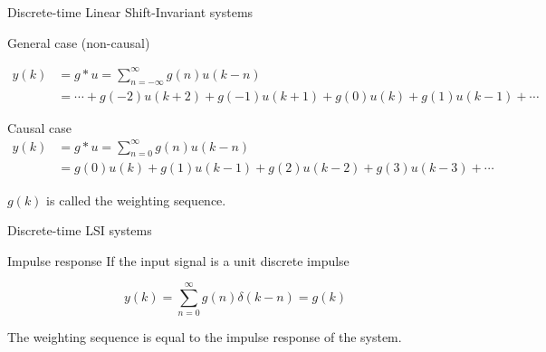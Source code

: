 \documentclass[presentation,aspectratio=169]{beamer}
\begin{document}
\begin{frame}[label={sec:org0ba1e00}]{Discrete-time Linear Shift-Invariant systems}
\small

\begin{center}
\end{center}

\pause

\alert{General case (non-causal)}

\begin{align*}
 y(k) &= g \ast u = \sum_{n=-\infty}^\infty g(n) u(k-n)\\ &= \cdots + g(-2)u(k+2) + g(-1)u(k+1) + g(0)u(k) + g(1)u(k-1) + \cdots
 \end{align*}

\pause

\alert{Causal case}
\begin{align*}
 y(k) &= g \ast u = \sum_{n=0}^\infty g(n) u(k-n) \\
 &= g(0)u(k) + g(1)u(k-1) + g(2)u(k-2) + g(3)u(k-3) + \cdots
 \end{align*}


\(g(k)\) is called the \alert{weighting sequence}.
\end{frame}


\begin{frame}[label={sec:org143523b}]{Discrete-time LSI systems}
\begin{block}{Impulse response}
If the input signal is a unit discrete impulse

\begin{center}
\end{center}

\pause

\[ y(k) = \sum_{n=0}^\infty g(n) \delta(k-n) = g(k) \]

\alert{The weighting sequence is equal to the impulse response of the system.}
\end{block}
\end{frame}
\end{document}
